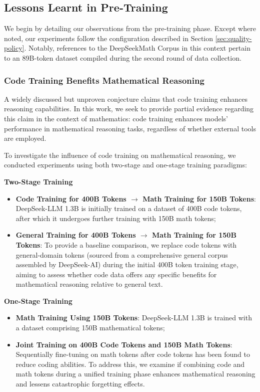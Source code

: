 \begin{itemize}[topsep=0pt]
\subsection{Lessons Learnt in Pre-Training}

We begin by detailing our observations from the pre-training phase. Except where noted, our experiments follow the configuration described in Section \ref{sec:quality-policy}. Notably, references to the DeepSeekMath Corpus in this context pertain to an 89B-token dataset compiled during the second round of data collection.

\subsubsection{Code Training Benefits Mathematical Reasoning}

A widely discussed but unproven conjecture claims that code training enhances reasoning capabilities. In this work, we seek to provide partial evidence regarding this claim in the context of mathematics: code training enhances models’ performance in mathematical reasoning tasks, regardless of whether external tools are employed.

To investigate the influence of code training on mathematical reasoning, we conducted experiments using both two-stage and one-stage training paradigms:

\textbf{Two-Stage Training}

\begin{itemize}[topsep=0pt]
    \item \textbf{Code Training for 400B Tokens $\rightarrow$ Math Training for 150B Tokens}: DeepSeek-LLM 1.3B is initially trained on a dataset of 400B code tokens, after which it undergoes further training with 150B math tokens;
    \item \textbf{General Training for 400B Tokens $\rightarrow$ Math Training for 150B Tokens}: To provide a baseline comparison, we replace code tokens with general-domain tokens (sourced from a comprehensive general corpus assembled by DeepSeek-AI) during the initial 400B token training stage, aiming to assess whether code data offers any specific benefits for mathematical reasoning relative to general text.
\end{itemize}

\textbf{One-Stage Training}

\begin{itemize}[topsep=0pt]
    \item \textbf{Math Training Using 150B Tokens}: DeepSeek-LLM 1.3B is trained with a dataset comprising 150B mathematical tokens;
    \item \textbf{Joint Training on 400B Code Tokens and 150B Math Tokens}: Sequentially fine-tuning on math tokens after code tokens has been found to reduce coding abilities. To address this, we examine if combining code and math tokens during a unified training phase enhances mathematical reasoning and lessens catastrophic forgetting effects.
\end{itemize}


\end{itemize}
